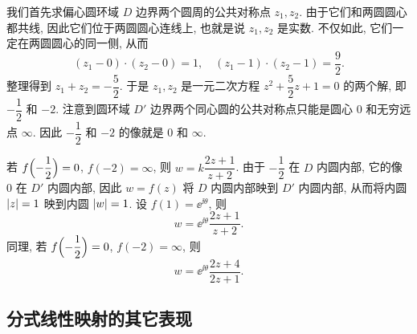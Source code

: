 \begin{solution}
  我们首先求偏心圆环域 $D$ 边界两个圆周的公共对称点 $z_1,z_2$.
  由于它们和两圆圆心都共线, 因此它们位于两圆圆心连线上, 也就是说 $z_1,z_2$ 是实数.
  不仅如此, 它们一定在两圆圆心的同一侧, 从而
  \[
    (z_1-0)\cdot (z_2-0)=1,\quad
    (z_1-1)\cdot(z_2-1)=\frac92.
  \]
  整理得到 $z_1+z_2=-\dfrac{5}2$.
  于是 $z_1,z_2$ 是一元二次方程 $z^2+\dfrac52z+1=0$ 的两个解, 即 $-\dfrac12$ 和 $-2$.
  注意到圆环域 $D'$ 边界两个同心圆的公共对称点只能是圆心 $0$ 和无穷远点 $\infty$.
  因此 $-\dfrac12$ 和 $-2$ 的像就是 $0$ 和 $\infty$.

  若 $f\Bigl(-\dfrac12\Bigr)=0$, $f(-2)=\infty$, 则 $w=k\dfrac{2z+1}{z+2}$. \smallskip
  由于 $-\dfrac12$ 在 $D$ 内圆内部, 它的像 $0$ 在 $D'$ 内圆内部, 因此 $w=f(z)$ 将 $D$ 内圆内部映到 $D'$ 内圆内部, 从而将内圆 $\left|z\right|=1$ 映到内圆 $\left|w\right|=1$.
  设 $f(1)=\ee^{\ii\theta}$, 则
  \[
    w=\ee^{\ii\theta}\dfrac{2z+1}{z+2}.
  \]
  同理, 若 $f\Bigl(-\dfrac12\Bigr)=0$, $f(-2)=\infty$, 则 
  \[
    w=\ee^{\ii\theta}\dfrac{2z+4}{2z+1}.
  \]
\end{solution}


\subsection{分式线性映射的其它表现\optional}

